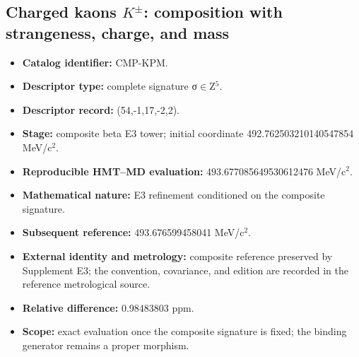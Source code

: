 \subsection{Charged kaons \(K^\pm\): composition with strangeness, charge, and mass}
\begin{itemize}
\item \textbf{Catalog identifier:} CMP-KPM.
\item \textbf{Descriptor type:} complete signature σ\(\in\)Z\({}^{5}\).
\item \textbf{Descriptor record:} (54,-1,17,-2,2).
\item \textbf{Stage:} composite beta E3 tower; initial coordinate 492.762503\allowbreak{}210140\allowbreak{}547854 MeV/c\({}^{2}\).
\item \textbf{Reproducible HMT--MD evaluation:} 493.677085\allowbreak{}649530\allowbreak{}612476 MeV/c\({}^{2}\).
\item \textbf{Mathematical nature:} E3 refinement conditioned on the composite signature.
\item \textbf{Subsequent reference:} 493.676599\allowbreak{}458041 MeV/c\({}^{2}\).
\item \textbf{External identity and metrology:} composite reference preserved by Supplement E3; the convention, covariance, and edition are recorded in the reference metrological source.
\item \textbf{Relative difference:} 0.984838\allowbreak{}03 ppm.
\item \textbf{Scope:} exact evaluation once the composite signature is fixed; the binding generator remains a proper morphism.
\end{itemize}
